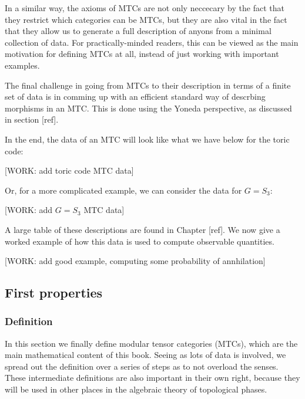 \documentclass{article}
\theoremstyle{definition}
\newcommand{\0}{\left|0\right>}
\newcommand{\1}{\left|1\right>}
\numberwithin{figure}{section}
\begin{document}
In a similar way, the axioms of MTCs are not only neccecary by the fact that they restrict which categories can be MTCs, but they are also vital in the fact that they allow us to generate a full description of anyons from a minimal collection of data. For practically-minded readers, this can be viewed as the main motivation for defining MTCs at all, instead of just working with important examples.

The final challenge in going from MTCs to their description in terms of a finite set of data is in comming up with an efficient standard way of descrbing morphisms in an MTC. This is done using the Yoneda perspective, as discussed in section [ref].

In the end, the data of an MTC will look like what we have below for the toric code:

[WORK: add toric code MTC data]

Or, for a more complicated example, we can consider the data for $G=S_3$:

[WORK: add $G=S_3$ MTC data]

A large table of these descriptions are found in Chapter [ref]. We now give a worked example of how this data is used to compute observable quantities.

[WORK: add good example, computing some probability of annhilation]

\subsection{First properties}

\subsubsection{Definition}

In this section we finally define modular tensor categories (MTCs), which are the main mathematical content of this book. Seeing as lots of data is involved, we spread out the definition over a series of steps as to not overload the senses. These intermediate definitions are also important in their own right, because they will be used in other places in the algebraic theory of topological phases.
\end{document}
